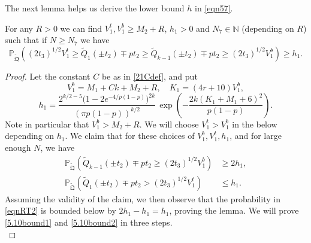 \noindent The next lemma helps us derive the lower bound $h$ in \eqref{eqn57}.

\begin{lemma}\label{LemmaBP2} For any $R > 0$ we can find $V_1^t, V_1^b \geq M_2 + R$, $h_1 > 0$ and $N_7 \in \mathbb{N}$ (depending on $R$) such that if $N \geq N_7$ we have
	\begin{equation}\label{eqnRT2}
	\mathbb{P}_{\tilde{\mathfrak{Q}}} \left(  (2t_3)^{1/2} V_1^t \geq \tilde{Q}_1(\pm t_2) \mp p t_2 \geq \tilde{Q}_{k-1}(\pm t_2) \mp p t_2 \geq (2t_3)^{1/2} V_1^b  \right) \geq h_1.
	\end{equation}
	
\end{lemma}

\begin{proof}
	
	Let the constant $C$ be as in \eqref{21Cdef}, and put
	\begin{equation}\label{5.10Vb}
	V_1^b = M_1 + Ck + M_2 + R, \quad K_1 = (4r+10)V_1^b,
	\end{equation}
	\begin{equation}\label{5.10h1}
	h_1 =  \frac{2^{k/2-5}\big(1-2e^{-4/p(1-p)}\big)^{2k}}{(\pi p(1-p))^{k/2}}\,\exp\left(-\frac{2k(K_1+M_1+6)^2}{p(1-p)}\right).
	\end{equation}
	Note in particular that $V_1^b > M_2 + R$. We will choose $V_1^t > V_1^b$ in the below depending on $h_1$. We claim that for these choices of  $V_1^b, V_1^t, h_1$, and for large enough $N$, we have 
	\begin{align}
	\mathbb{P}_{\tilde{\mathfrak{Q}}}\left(\tilde{Q}_{k-1}(\pm t_2) \mp pt_2 \geq (2t_3)^{1/2}V_1^b\right) &\geq 2h_1, \label{5.10bound1}\\
	\mathbb{P}_{\tilde{\mathfrak{Q}}}\left(\tilde{Q}_1(\pm t_2) \mp pt_2 > (2t_3)^{1/2}V_1^t\right) &\leq h_1. \label{5.10bound2}
	\end{align}
	Assuming the validity of the claim, we then observe that the probability in \eqref{eqnRT2} is bounded below by $2h_1 - h_1 = h_1$, proving the lemma. We will prove \eqref{5.10bound1} and \eqref{5.10bound2} in three steps.\\
	

\end{proof}
